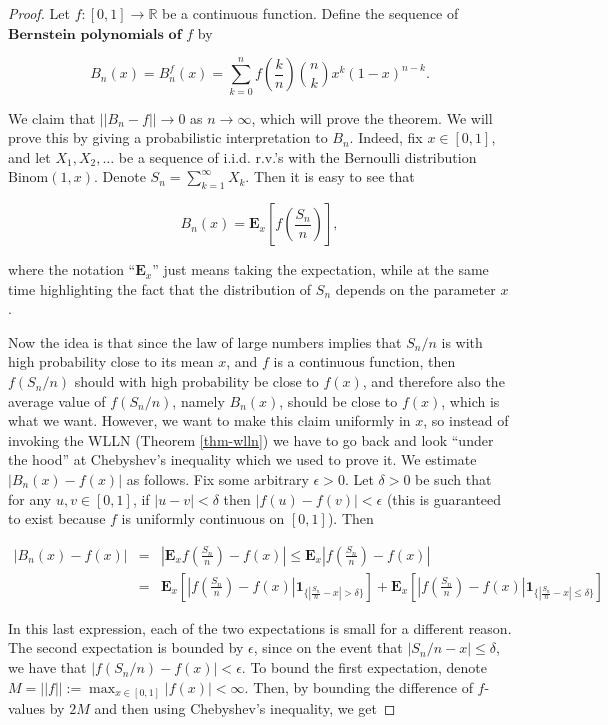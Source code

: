 \documentclass[11pt]{report}
\newcommand{\R}{\mathbb{R}}
\theoremstyle{plain}
\theoremstyle{definition}
\begin{document}
\begin{proof}
Let $f:[0,1]\to\R$ be a continuous function. Define
the sequence of $\textbf{Bernstein polynomials of } f$
by

\[
B_n(x)= B_n^f(x) = \sum_{k=0}^n f\left(\frac{k}{n}\right) \binom{n}{k} x^k (1-x)^{n-k}.
\]

We claim that $||B_n-f||\to 0$ as $n\to\infty$,
which will prove the theorem. We will prove this by
giving a probabilistic interpretation to $B_n$.
Indeed, fix $x\in [0,1]$, and let $X_1,X_2,\ldots$ be
a sequence of i.i.d. r.v.'s with the Bernoulli
distribution $\textrm{Binom}(1,x)$. Denote
$S_n=\sum_{k=1}^\infty X_k$. Then it is easy to see
that

\[
B_n(x) = \mathbf{E}_x \left[f\left(\frac{S_n}{n}\right)\right],
\]

where the notation ``$\mathbf{E}_x$'' just means
taking the expectation, while at the same time
highlighting the fact that the distribution of $S_n$
depends on the parameter $x$.

Now the idea is that since the law of large numbers
implies that $S_n/n$ is with high probability close
to its mean $x$, and $f$ is a continuous function,
then $f(S_n/n)$ should with high probability be close
to $f(x)$, and therefore also the average value of
$f(S_n/n)$, namely $B_n(x)$, should be close to
$f(x)$, which is what we want. However, we want to
make this claim uniformly in $x$, so instead of
invoking the WLLN (Theorem \ref{thm-wlln}) we have to go
back and look ``under the hood'' at Chebyshev's
inequality which we used to prove it. We estimate
$|B_n(x)-f(x)|$ as follows. Fix some arbitrary
$\epsilon>0$. Let $\delta>0$ be such that for any
$u,v\in[0,1]$, if $|u-v|<\delta$ then
$|f(u)-f(v)|<\epsilon$ (this is guaranteed to exist
because $f$ is uniformly continuous on $[0,1]$). Then

\begin{eqnarray*}
|B_n(x)-f(x)| &=& \left|\mathbf{E}_x f\left(\frac{S_n}{n}\right)-f(x)\right| \le \mathbf{E}_x \left|f\left(\frac{S_n}{n}\right)-f(x)\right| \\
&=& \mathbf{E}_x \left[\left|f\left(\frac{S_n}{n}\right)-f(x)\right|\mathbf{1}_{\{ \left|\frac{S_n}{n}-x\right|>\delta \}}\right] +
\mathbf{E}_x \left[\left|f\left(\frac{S_n}{n}\right)-f(x)\right|\mathbf{1}_{\{ \left|\frac{S_n}{n}-x\right|\le\delta \}}\right]
\end{eqnarray*}

In this last expression, each of the two
expectations is small for a different reason. The
second expectation is bounded by $\epsilon$, since on
the event that $|S_n/n-x|\le \delta$, we have that
$|f(S_n/n)-f(x)|<\epsilon$. To bound the first
expectation, denote
$M=||f||:=\max_{x\in[0,1]}|f(x)|<\infty$. Then, by
bounding the difference of $f$-values by $2M$ and
then using Chebyshev's inequality, we get


\end{proof}
\end{document}
